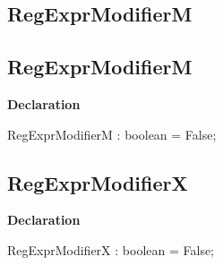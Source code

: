 \documentclass{report}
\newif\ifpdf
\begin{document}
\subsection*{\large{\textbf{RegExprModifierM}}\normalsize\hspace{1ex}\hrulefill}
\else
\subsection*{RegExprModifierM}
\fi
\label{RegExpr-RegExprModifierM}
\begin{list}{}{
\setlength{\itemindent}{0cm}
\setlength{\listparindent}{0cm}
\setlength{\leftmargin}{\evensidemargin}
\addtolength{\leftmargin}{\tmplength}
\settowidth{\labelsep}{X}
\addtolength{\leftmargin}{\labelsep}
\setlength{\labelwidth}{\tmplength}
}
\item[\textbf{Declaration}\hfill]
\ifpdf
\begin{flushleft}
\fi
\begin{ttfamily}
RegExprModifierM : boolean = False;\end{ttfamily}

\ifpdf
\end{flushleft}
\fi

\end{list}
\ifpdf
\subsection*{\large{\textbf{RegExprModifierX}}\normalsize\hspace{1ex}\hrulefill}
\else
\subsection*{RegExprModifierX}
\fi
\label{RegExpr-RegExprModifierX}
\begin{list}{}{
\setlength{\itemindent}{0cm}
\setlength{\listparindent}{0cm}
\setlength{\leftmargin}{\evensidemargin}
\addtolength{\leftmargin}{\tmplength}
\settowidth{\labelsep}{X}
\addtolength{\leftmargin}{\labelsep}
\setlength{\labelwidth}{\tmplength}
}
\item[\textbf{Declaration}\hfill]
\ifpdf
\begin{flushleft}
\fi
\begin{ttfamily}
RegExprModifierX : boolean = False;\end{ttfamily}

\ifpdf
\end{flushleft}
\fi

\end{list}
\ifpdf
\end{document}
